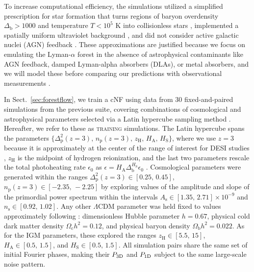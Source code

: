 \documentclass[longauth]{aa}
\newcommand{\lyaf}{Lyman-$\alpha$ forest\xspace}
\newcommand{\poned}{\ensuremath{P_{\rm 1D}}\xspace}
\newcommand{\pthreed}{\ensuremath{P_{\rm 3D}}\xspace}
\newcommand{\lacehc}{\textsc{training}\xspace}
\begin{document}
To increase computational efficiency, the simulations utilized a simplified prescription for star formation that turns regions of baryon overdensity $\Delta_\mathrm{b}>1000$ and temperature $T<10^5$ K into collisionless stars \citep[e.g.,][]{viel2004ConstraintsPrimordialPower}, implemented a spatially uniform ultraviolet background \citep{haardt2012RadiativeTransferClumpya}, and did not consider active galactic nuclei (AGN) feedback \citep[e.g.,][]{chabanier2020ImpactAGNFeedback}. These approximations are justified because we focus on emulating the \lyaf in the absence of astrophysical contaminants like AGN feedback, damped Lyman-alpha absorbers (DLAs), or metal absorbers, and we will model these before comparing our predictions with observational measurements \citep[e.g.,][]{mcdonald2005LinearTheoryPower, palanque-delabrouille2015ConstraintNeutrinoMasses, palanque-delabrouille2020HintsNeutrinoBounds}.

In Sect.~\ref{sec:forestflow}, we train a cNF using data from 30 fixed-and-paired simulations from the previous suite, covering combinations of cosmological and astrophysical parameters selected via a Latin hypercube sampling method \citep{mckay1979ComparisonThreeMethods}. Hereafter, we refer to these as \lacehc simulations. The Latin hypercube spans the parameters $\{\Delta^2_\mathrm{p}(z=3),\, n_\mathrm{p}(z=3),\, z_\mathrm{H},\, H_\mathrm{A},\, H_\mathrm{S}\}$, where we use $z=3$ because it is approximately at the center of the range of interest for DESI studies \citep{ravoux2023DarkEnergySpectroscopica, karacayli2024Optimal1DLy}, $z_\mathrm{H}$ is the midpoint of hydrogen reionization, and the last two parameters rescale the total photoheating rate $\epsilon_0$ as $\epsilon = H_\mathrm{A} \Delta_\mathrm{b}^{H_\mathrm{S}} \epsilon_0$ \citep{onorbe2017SelfconsistentModelingReionization}. Cosmological parameters were generated within the ranges $\Delta^2_\mathrm{p}(z=3) \in [0.25,\, 0.45]$, $n_\mathrm{p}(z=3) \in [-2.35,\, -2.25]$ by exploring values of the amplitude and slope of the primordial power spectrum within the intervals $A_\mathrm{s} \in [1.35,\, 2.71]\times 10^{-9}$ and $n_\mathrm{s} \in [0.92,\, 1.02]$. Any other $\Lambda$CDM parameter was held fixed to values approximately following \citet{planckcollaboration2020Planck2018Resultsa}: dimensionless Hubble parameter $h=0.67$, physical cold dark matter density $\Omega_\mathrm{c} h^2=0.12$, and physical baryon density $\Omega_\mathrm{b} h^2=0.022$. As for the IGM parameters, these explored the ranges $z_\mathrm{H}\in[5.5,\,15]$, $H_\mathrm{A}\in[0.5,\,1.5]$, and $H_\mathrm{S}\in[0.5,\,1.5]$. All simulation pairs share the same set of initial Fourier phases, making their \pthreed and \poned subject to the same large-scale noise pattern.
\end{document}
